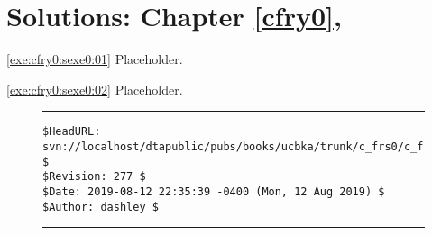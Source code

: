 
\chapter[Solutions: \cfryzeroxrefcomma{}Chapter \ref{cfry0}]
        {Solutions: \cfryzeroxrefcomma{}Chapter \ref{cfry0}, \cfryzerolongtitle{}}

\label{cfrs0}

\vworkexercisechapterheader{}
\begin{vworkexercisesolution}{\ref{exe:cfry0:sexe0:01}}
Placeholder.
\end{vworkexercisesolution}
\vworkexerciseseparator
\begin{vworkexercisesolution}{\ref{exe:cfry0:sexe0:02}}
Placeholder.
\end{vworkexercisesolution}
\vworkexercisechapterfooter


\vfill
\noindent\begin{figure}[!b]
\noindent\rule[-0.25in]{\textwidth}{1pt}
\begin{tiny}
\begin{verbatim}
$HeadURL: svn://localhost/dtapublic/pubs/books/ucbka/trunk/c_frs0/c_frs0.tex $
$Revision: 277 $
$Date: 2019-08-12 22:35:39 -0400 (Mon, 12 Aug 2019) $
$Author: dashley $
\end{verbatim}
\end{tiny}
\noindent\rule[0.25in]{\textwidth}{1pt}
\end{figure}

%
